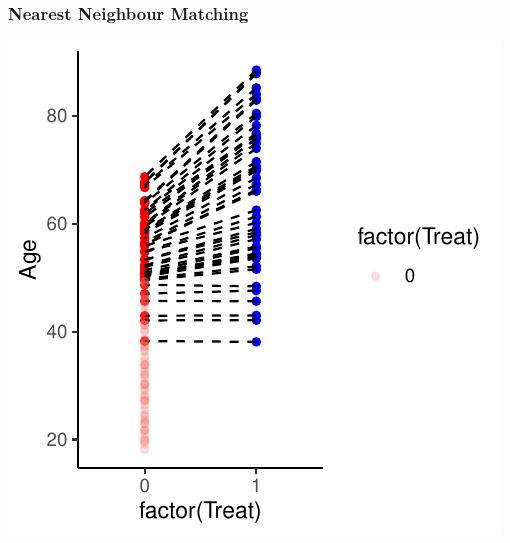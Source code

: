 \documentclass[xcolor=x11names,compress]{beamer}\usepackage[]{graphicx}\usepackage[]{color}
\makeatletter
\def\maxwidth{ %
  \ifdim\Gin@nat@width>\linewidth
    \linewidth
  \else
    \Gin@nat@width
  \fi
}
\newenvironment{knitrout}{}{} %
\renewcommand{\(}{\begin{columns}}
\renewcommand{\)}{\end{columns}}
\newcommand{\<}[1]{\begin{column}{#1}}
\renewcommand{\>}{\end{column}}
\makeatother
\begin{document}
\begin{frame}
\frametitle{Nearest Neighbour Matching}
\begin{center}
\begin{knitrout}
\color{fgcolor}
\includegraphics[width=\maxwidth]{figure/nearest_matching_3-1} 

\end{knitrout}
\end{center}
\end{frame}
\end{document}
